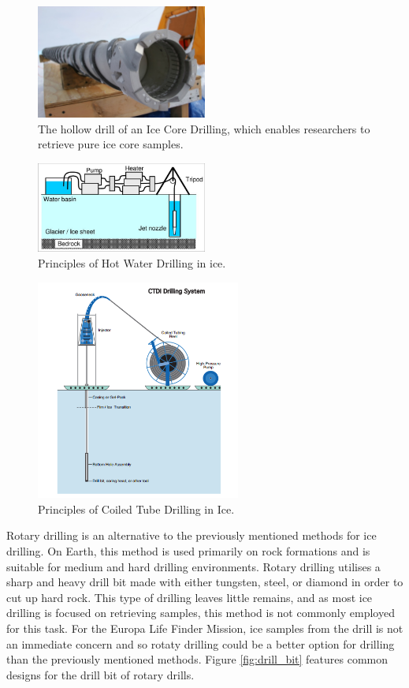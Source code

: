 \begin{figure}[htb]
  \centering
  \includegraphics[width=0.5\textwidth]{figures/mlh/ICD}
  \caption{The hollow drill of an Ice Core Drilling, which enables researchers to retrieve pure ice core samples.}
  \label{fig:ICD}
\end{figure}
\begin{figure}[htb]
  \centering
  \includegraphics[width=0.5\textwidth]{figures/mlh/HWD}
  \caption{Principles of Hot Water Drilling in ice.}
  \label{fig:HWD}
\end{figure}
\begin{figure}[htb]
  \centering
  \includegraphics[width=0.6\textwidth]{figures/mlh/CTDI}
  \caption{Principles of Coiled Tube Drilling in Ice.}
  \label{fig:CTDI}
\end{figure}

Rotary drilling is an alternative to the previously mentioned methods for ice drilling. On Earth, this method is used primarily on rock formations and is suitable for medium and hard drilling environments. Rotary drilling utilises a sharp and heavy drill bit made with either tungsten, steel, or diamond in order to cut up hard rock. This type of drilling leaves little remains, and as most ice drilling is focused on retrieving samples, this method is not commonly employed for this task. For the Europa Life Finder Mission, ice samples from the drill is not an immediate concern and so rotaty drilling could be a better option for drilling than the previously mentioned methods. Figure \ref{fig:drill_bit} features common designs for the drill bit of rotary drills.

